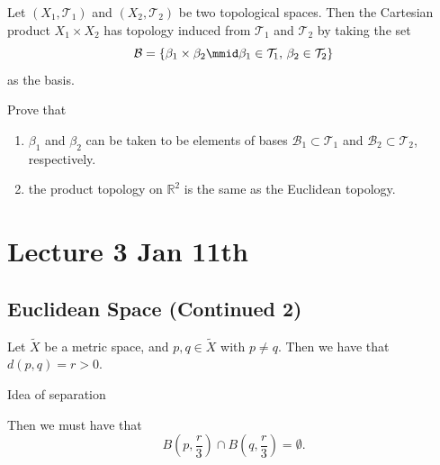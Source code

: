 \documentclass[notoc,notitlepage]{tufte-book}
\begin{document}
\begin{eg}
  Let $(X_1, \mathcal{T}_1)$ and $(X_2, \mathcal{T}_2)$ be two topological spaces.
  Then the Cartesian product $X_1 \times X_2$ has topology induced
  from $\mathcal{T}_1$ and $\mathcal{T}_2$ by taking the set
  \begin{equation*}
    \mathcal{B} = \left\{ \beta_1 \times \beta_2 \mmid \beta_1 \in \mathcal{T}_1, \, \beta_2 \in \mathcal{T}_2 \right\}
  \end{equation*}
  as the basis.
\end{eg}

\begin{ex}
  Prove that
  \begin{enumerate}
    \item $\beta_1$ and $\beta_2$ can be taken to be elements of
      bases $\mathcal{B}_1 \subset \mathcal{T}_1$ and
      $\mathcal{B}_2 \subset \mathcal{T}_2$, respectively.
    \item the product topology on $\mathbb{R}^2$ is the same
      as the Euclidean topology.
  \end{enumerate}
\end{ex}



\chapter{Lecture 3 Jan 11th}%
\label{chp:lecture_3_jan_11th}

\section{Euclidean Space (Continued 2)}%
\label{sec:euclidean_space_continued_2}


Let $\tilde{X}$ be a metric space, and $p, q \in \tilde{X}$ with $p \neq q$.
Then we have that $d(p, q) = r > 0$.
\begin{marginfigure}
  \centering
  \caption{Idea of separation}\label{fig:idea_of_separation}
\end{marginfigure}
Then we must have that
\begin{equation*}
  B \left( p, \frac{r}{3} \right) \cap B \left( q, \frac{r}{3} \right) = \emptyset.
\end{equation*}
\end{document}
